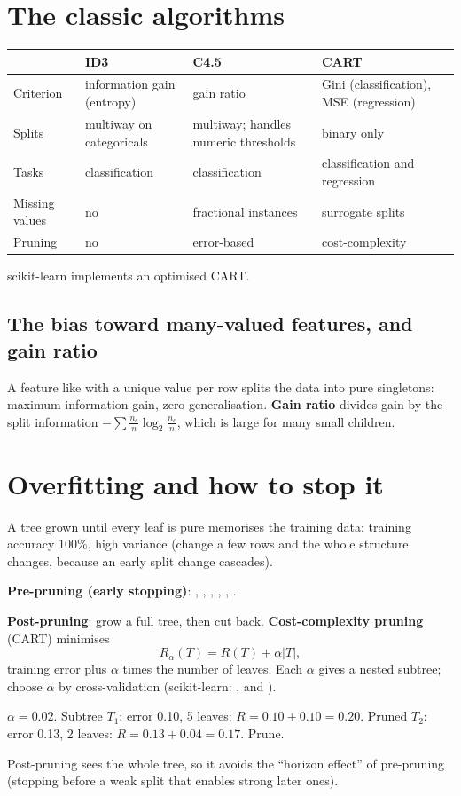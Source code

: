 \section{The classic algorithms}
\begin{center}\small
\begin{tabularx}{\linewidth}{l X X X}
\toprule
& ID3 & C4.5 & CART\\
\midrule
Criterion & information gain (entropy) & gain ratio & Gini (classification), MSE (regression)\\
Splits & multiway on categoricals & multiway; handles numeric thresholds & binary only\\
Tasks & classification & classification & classification and regression\\
Missing values & no & fractional instances & surrogate splits\\
Pruning & no & error-based & cost-complexity\\
\bottomrule
\end{tabularx}
\end{center}
scikit-learn implements an optimised CART.

\subsection{The bias toward many-valued features, and gain ratio}
A feature like  with a unique value per row splits the data into pure singletons: maximum information
gain, zero generalisation. \textbf{Gain ratio} divides gain by the split information $-\sum\frac{n_c}{n}\log_2\frac{n_c}{n}$,
which is large for many small children.

\section{Overfitting and how to stop it}
A tree grown until every leaf is pure memorises the training data: training accuracy 100\%, high variance (change a few
rows and the whole structure changes, because an early split change cascades).

\textbf{Pre-pruning (early stopping)}: , , ,
, , .

\textbf{Post-pruning}: grow a full tree, then cut back. \textbf{Cost-complexity pruning} (CART) minimises
\[ R_\alpha(T) = R(T) + \alpha|T|, \]
training error plus $\alpha$ times the number of leaves. Each $\alpha$ gives a nested subtree; choose $\alpha$ by cross-validation
(scikit-learn: , and ).
\begin{example}
$\alpha = 0.02$. Subtree $T_1$: error 0.10, 5 leaves: $R = 0.10 + 0.10 = 0.20$. Pruned $T_2$: error 0.13, 2 leaves:
$R = 0.13 + 0.04 = 0.17$. Prune.
\end{example}
Post-pruning sees the whole tree, so it avoids the ``horizon effect'' of pre-pruning (stopping before a weak split that
enables strong later ones).

